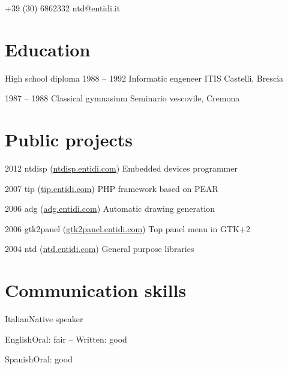 \documentclass{tccv}
\begin{document}
    {+39 (30) 6862332}
    {ntd@entidi.it}

\section{Education}

\begin{yearlist}

\item[High school diploma]{1988 -- 1992}
     {Informatic engeneer}
     {ITIS Castelli, Brescia}

\item{1987 -- 1988}
     {Classical gymnasium}
     {Seminario vescovile, Cremona}

\end{yearlist}

\section{Public projects}

\begin{yearlist}

\item{2012}
     {ntdisp (\href{http://ntdisp.entidi.com/}{ntdisp.entidi.com})}
     {Embedded devices programmer}

\item{2007}
     {tip (\href{http://tip.entidi.com/}{tip.entidi.com})}
     {PHP framework based on PEAR}

\item{2006}
     {adg (\href{http://adg.entidi.com/}{adg.entidi.com})}
     {Automatic drawing generation}

\item{2006}
     {gtk2panel (\href{http://gtk2panel.entidi.com/}{gtk2panel.entidi.com})}
     {Top panel menu in GTK+2}

\item{2004}
     {ntd (\href{http://ntd.entidi.com/}{ntd.entidi.com})}
     {General purpose libraries}

\end{yearlist}

\section{Communication skills}

\begin{factlist}
\item{Italian}{Native speaker}
\item{English}{Oral: fair -- Written: good}
\item{Spanish}{Oral: good}
\end{factlist}
\end{document}
